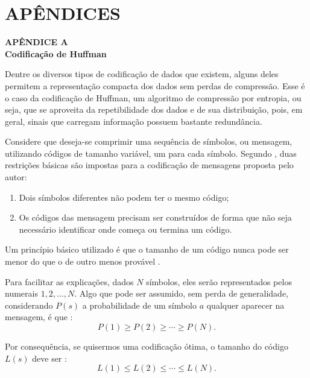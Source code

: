 \documentclass[cic,tc]{iiufrgs}
\begin{document}



\chapter*{APÊNDICES}
{
    \centering
    \textbf{APÊNDICE A} \\
    \textbf{Codificação de Huffman} \par
}
\vspace{1em}

Dentre os diversos tipos de codificação de dados que existem, alguns deles 
permitem a representação compacta dos dados sem perdas de compressão.
Esse é o caso da codificação de Huffman, um algoritmo de compressão por entropia,
ou seja, que se aproveita da repetibilidade dos dados e de sua distribuição, 
pois, em geral, sinais que carregam informação possuem bastante redundância.

Considere que deseja-se comprimir uma sequência de 
símbolos, ou mensagem, utilizando códigos de tamanho variável, um para cada símbolo.
Segundo \citet{HuffmanCoding}, duas restrições básicas são impostas para 
a codificação de mensagens proposta pelo autor:
\begin{enumerate}
    \item Dois símbolos diferentes não podem ter o mesmo código;
    \item Os códigos das mensagem precisam ser construídos de forma que não seja necessário 
    identificar onde começa ou termina um código.
\end{enumerate}

Um princípio básico utilizado é que o tamanho de um código nunca pode ser menor 
do que o de outro menos provável \cite{HuffmanCoding}.

Para facilitar as explicações, dados $N$ símbolos, eles serão representados 
pelos numerais $1, 2, ..., N$.
Algo que pode ser assumido, sem perda de generalidade, considerando $P(s)$ a probabilidade de um símbolo
$a$ qualquer aparecer na mensagem, é que \cite{HuffmanCoding}:
\begin{equation}
    \label{eq:hufprob}
    P(1) \ge P(2) \ge \cdots \ge P(N).
\end{equation}

Por consequência, se quisermos uma codificação ótima, o tamanho do código $L(s)$ 
deve ser \cite{HuffmanCoding}:
\begin{equation}
    \label{eq:huflen}
    L(1) \le L(2) \le \cdots \le L(N).
\end{equation}
\end{document}
